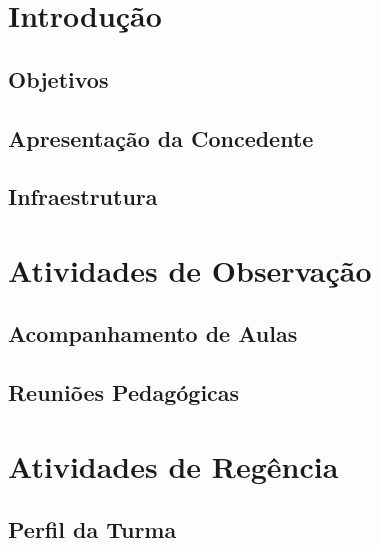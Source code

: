 \documentclass[aspectratio=169]{beamer}
\begin{document}
\usetikzlibrary{positioning}
\usetikzlibrary{shadows.blur, trees}

\newcommand{\autor}{Rodrigo Nascimento}
\newcommand{\github}{github.com/physikices}
\newcommand{\email}{rodrigo.nascimento@edu.udesc.br}
\newcommand{\website}{}
\capa


\section{Introdução}
\subsection{Objetivos}
\subsection{Apresentação da Concedente}
\subsection{Infraestrutura}

\section{Atividades de Observação}
\subsection{Acompanhamento de Aulas}
\subsection{Reuniões Pedagógicas}

\section{Atividades de Regência}
\subsection{Perfil da Turma}
\end{document}
